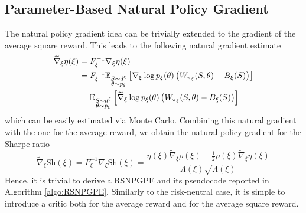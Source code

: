 \subsection{Parameter-Based Natural Policy Gradient}
The natural policy gradient idea can be trivially extended to the gradient of the average square reward. This leads to the following natural gradient estimate 
\begin{equation}
	\begin{split}
	\widetilde{\nabla}_\xi \eta(\xi) &=  F_\xi^{-1} \nabla_\xi \eta(\xi)\\
									 &=  F_\xi^{-1} \E[\substack{S \sim d^\xi\\\theta \sim p_\xi}]{\nabla_\xi \log p_\xi(\theta) \left(W_{\pi_\xi}(S, \theta) - B_\xi(S)\right)}\\
									 &=\E[\substack{S \sim d^\xi\\\theta \sim p_\xi}]{\widetilde{\nabla}_\xi \log p_\xi(\theta) \left(W_{\pi_\xi}(S, \theta) - B_\xi(S)\right)}
	\end{split}
\end{equation}
which can be easily estimated via Monte Carlo. Combining this natural gradient with the one for the average reward, we obtain the natural policy gradient for the Sharpe ratio
\begin{equation}
	\widetilde{\nabla}_\xi \text{Sh}(\xi) = F_\xi^{-1} \nabla_\xi \text{Sh}(\xi) = \frac{\eta(\xi) \widetilde{\nabla}_\xi \rho(\xi) - \frac{1}{2} \rho(\xi) \widetilde{\nabla}_\xi \eta(\xi)}{\Lambda(\xi) \sqrt{\Lambda(\xi)}}
\end{equation}
Hence, it is trivial to derive a \gls{RSNPGPE} and its pseudocode reported in Algorithm \ref{algo:RSNPGPE}. Similarly to the risk-neutral case, it is simple to introduce a critic both for the average reward and for the average square reward. 

